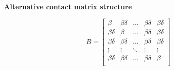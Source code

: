 \textbf{Alternative contact matrix structure}

\begin{equation}
B = \left[{
\begin{array}{ccccc}
  {\beta} & {\beta \delta} & \ldots & {\beta \delta} & {\beta \delta}  \\
  {\beta \delta} & {\beta} & \ldots & {\beta \delta} & {\beta \delta} \\
{\beta \delta} & {\beta \delta} & \ldots & {\beta \delta} & {\beta \delta}  \\
  \vdots & \vdots & \ddots & \vdots & \vdots \\
  {\beta \delta} & {\beta \delta} & \ldots & {\beta \delta} & {\beta}  \\
\end{array}
}\right]
\end{equation}